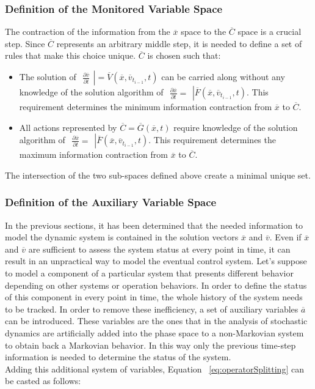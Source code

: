 \subsubsection{Definition of the Monitored Variable Space}
The contraction of the information from the $\overline{x}$ space to the $\overline{C}$ space is a crucial step.
Since $\overline{C}$ represents an arbitrary middle step, it is needed to define a set of rules that make this
choice unique. $\overline{C}$ is chosen such that:
\begin{itemize}
  \item The solution of  $ \left.\begin{matrix} \frac{\partial \overline{v} }{\partial t}
  \end{matrix}\right| =\overline{V}\left (  \overline{x},\overline{v}_{t_{i-1}}, t \right )$
  can be carried along without any knowledge of the solution algorithm of
   $ \left.\begin{matrix}
  \frac{\partial \overline{x} }{\partial t} =  \end{matrix}\right| \overline{F}\left (
  \overline{x},\overline{v}_{t_{i-1}}, t \right )
  $. This requirement determines the minimum information contraction from  $\overline{x}$ to
  $\overline{C}$.
  \item All actions represented by $\overline{C} = \overline{G}(\overline{x},t)$ require knowledge of the
  solution algorithm of
  $ \left.\begin{matrix}
  \frac{\partial \overline{x} }{\partial t} =  \end{matrix}\right| \overline{F}\left (
  \overline{x},\overline{v}_{t_{i-1}}, t \right )  $. This requirement determines  the maximum  information contraction from  $\overline{x}$ to  $\overline{C}$.
\end{itemize}
The intersection of the two sub-spaces defined above create a minimal unique set.
\subsubsection{Definition of the Auxiliary Variable Space}
In the previous sections, it has been determined that the needed information to model the dynamic system
is contained in the solution vectors $\overline{x}$ and $\overline{v}$. Even if $\overline{x}$ and $\overline{v}$
are sufficient to assess the system status at every point in time, it can result in an unpractical way to model
the eventual control system.
Let's suppose to model a component of a particular system that presents different behavior depending on
other systems or operation behaviors. In order to define the status of this component in every point in time, the
whole history of the system needs to be tracked. In order to remove these inefficiency, a set of auxiliary variables
$\overline{a}$ can be introduced. These variables are the ones that in the analysis of stochastic dynamics
are artificially added into the phase space to a non-Markovian system to obtain back a Markovian behavior. In this
way only the previous time-step information is needed to determine the status of the system.
\\ Adding this additional system of variables, Equation ~\ref{eq:operatorSplitting} can be casted as follows:

